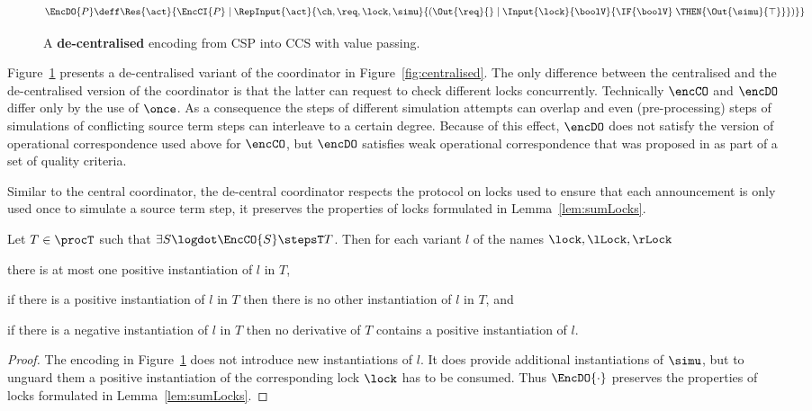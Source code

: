 \documentclass[]{eptcs}
\begin{document}
\begin{figure}
	\begin{align*}
		\EncDO{P} \deff & \Res{\act}{\EncCI{P} \mid \RepInput{\act}{\ch, \req, \lock, \simu}{\left( \Out{\req}{} \mid \Input{\lock}{\boolV}{\IF{\boolV}\;\THEN{\Out{\simu}{\top}}} \right)}}
	\end{align*}
	\caption{A \textbf{de-centralised} encoding from CSP into CCS with value passing.}
	\label{fig:decentralised}
\end{figure}

Figure~\ref{fig:decentralised} presents a de-centralised variant of the coordinator in Figure~\ref{fig:centralised}.
The only difference between the centralised and the de-centralised version of the coordinator is that the latter can request to check different locks concurrently. Technically $ \encCO $ and $ \encDO $ differ only by the use of $ \once $. As a consequence the steps of different simulation attempts can overlap and even (pre-processing) steps of simulations of conflicting source term steps can interleave to a certain degree. Because of this effect, $ \encDO $ does not satisfy the version of operational correspondence used above for $ \encCO $, but $ \encDO $ satisfies weak operational correspondence that was proposed in \cite{gorla10} as part of a set of quality criteria.

Similar to the central coordinator, the de-central coordinator respects the protocol on locks used to ensure that each announcement is only used once to simulate a source term step, \ie it preserves the properties of locks formulated in Lemma~\ref{lem:sumLocks}.

\begin{prop}
	Let $ T \in \procT $ such that $ \exists S\logdot \EncCO{S} \stepsT T $. Then for each variant $ l $ of the names $ \lock, \lLock, \rLock $
	\begin{compactenum}
		\item there is at most one positive instantiation of $ l $ in $ T $,
		\item if there is a positive instantiation of $ l $ in $ T $ then there is no other instantiation of $ l $ in $ T $, and
		\item if there is a negative instantiation of $ l $ in $ T $ then no derivative of $ T $ contains a positive instantiation of $ l $.
	\end{compactenum}
	\label{prop:sumLocksDecentral}
\end{prop}

\begin{proof}
	The encoding in Figure~\ref{fig:decentralised} does not introduce new instantiations of $ l $. It does provide additional instantiations of $ \simu $, but to unguard them a positive instantiation of the corresponding lock $ \lock $ has to be consumed. Thus $ \EncDO{\cdot} $ preserves the properties of locks formulated in Lemma~\ref{lem:sumLocks}.
\end{proof}
\end{document}
